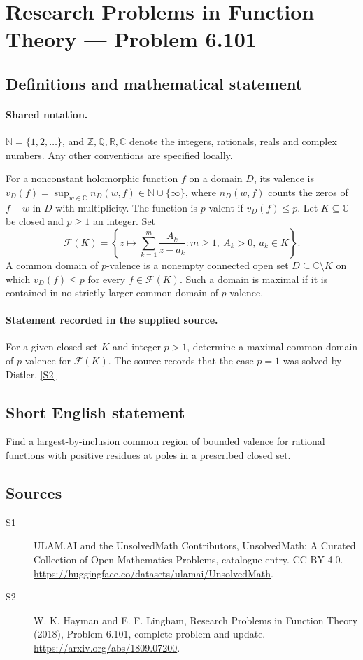 \documentclass[11pt]{article}
\newcommand{\sref}[2]{\hyperlink{source:#1:#2}{[S#2]}}
\begin{document}
\section{Research Problems in Function Theory — Problem 6.101}\label{statement}

\subsection{Definitions and mathematical statement}

\paragraph{Shared notation.}$\mathbb N=\{1,2,\ldots\}$, and $\mathbb Z,\mathbb Q,\mathbb R,\mathbb C$ denote the integers, rationals, reals and complex numbers. Any other conventions are specified locally.


For a nonconstant holomorphic function $f$ on a domain $D$, its valence is $v_D(f)=\sup_{w\in\mathbb C}n_D(w,f)\in\mathbb N\cup\{\infty\}$, where $n_D(w,f)$ counts the zeros of $f-w$ in $D$ with multiplicity. The function is $p$-valent if $v_D(f)\leq p$. Let $K\subseteq\mathbb C$ be closed and $p\geq1$ an integer. Set
\[\mathcal F(K)=\left\{z\longmapsto\sum_{k=1}^{m}\frac{A_k}{z-a_k}:m\geq1,\ A_k>0,\ a_k\in K\right\}.\]
A common domain of $p$-valence is a nonempty connected open set $D\subseteq\mathbb C\setminus K$ on which $v_D(f)\leq p$ for every $f\in\mathcal F(K)$. Such a domain is maximal if it is contained in no strictly larger common domain of $p$-valence.
\paragraph{Statement recorded in the supplied source.}
For a given closed set $K$ and integer $p>1$, determine a maximal common domain of $p$-valence for $\mathcal F(K)$. The source records that the case $p=1$ was solved by Distler. \sref{statement}{2}
\subsection{Short English statement}
Find a largest-by-inclusion common region of bounded valence for rational functions with positive residues at poles in a prescribed closed set.
\subsection{Sources}
\begin{description}
\item[\hypertarget{source:statement:1}{S1}] ULAM.AI and the UnsolvedMath Contributors, UnsolvedMath: A Curated Collection of Open Mathematics Problems, catalogue entry. CC BY 4.0. \url{https://huggingface.co/datasets/ulamai/UnsolvedMath}.
\item[\hypertarget{source:statement:2}{S2}] W. K. Hayman and E. F. Lingham, Research Problems in Function Theory (2018), Problem 6.101, complete problem and update. \url{https://arxiv.org/abs/1809.07200}.
\end{description}
\label{end:statement}
\end{document}
